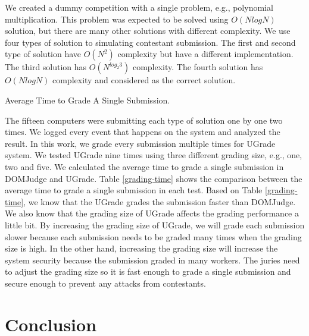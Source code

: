 \documentclass[conference,a4paper]{IEEEtran}
\begin{document}
We created a dummy competition with a single problem, e.g., polynomial multiplication. This problem was expected to be solved using $O(N log N)$ solution, but there are many other solutions with different complexity. We use four types of solution to simulating contestant submission. The first and second type of solution have $O(N^2)$ complexity but have a different implementation. The third solution has $O(N^{log_2{3}})$ complexity. The fourth solution has $O(N log N)$ complexity and considered as the correct solution.

\begin{table}[ht!]
    \label{grading-time}
    \caption{Average Time to Grade A Single Submission.}
    \begin{center}
        
    \end{center}
\end{table}

The fifteen computers were submitting each type of solution one by one two times. We logged every event that happens on the system and analyzed the result. In this work, we grade every submission multiple times for UGrade system. We tested UGrade nine times using three different grading size, e.g., one, two and five. We calculated the average time to grade a single submission in DOMJudge and UGrade. Table \ref{grading-time} shows the comparison between the average time to grade a single submission in each test. Based on Table \ref{grading-time}, we know that the UGrade grades the submission faster than DOMJudge. We also know that the grading size of UGrade affects the grading performance a little bit. By increasing the grading size of UGrade, we will grade each submission slower because each submission needs to be graded many times when the grading size is high. In the other hand, increasing the grading size will increase the system security because the submission graded in many workers. The juries need to adjust the grading size so it is fast enough to grade a single submission and secure enough to prevent any attacks from contestants.

\section{Conclusion}
\end{document}
